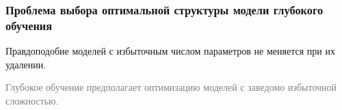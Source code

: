 \documentclass[usenames,dvipsnames,11pt,pdf,utf8,russian,aspectratio=43]{beamer}
\begin{document}
\begin{frame}    
                                                                                                                        
\frametitle{Проблема выбора оптимальной структуры модели глубокого обучения}                                                                                                          
Правдоподобие моделей с избыточным числом параметров не меняется при их удалении.                                                       
\begin{figure}[h]                                                                                                                               
\centering                                                                                                                                      
\end{figure}                                                                                                   
\textcolor{gray}{Глубокое обучение предполагает оптимизацию моделей с заведомо избыточной сложностью.}  

                                                                                                                                             
\end{frame}    
\end{document}
